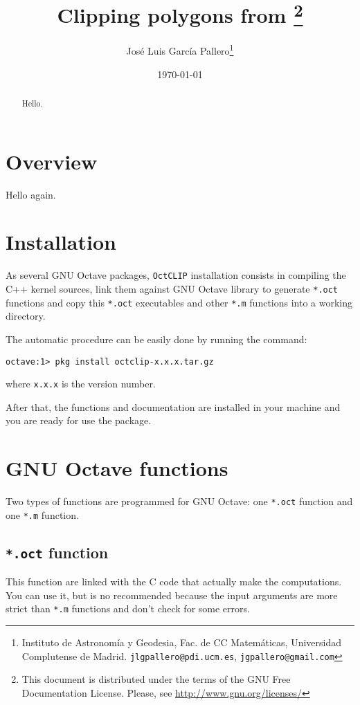 \documentclass[10pt,a4paper]{article}
\title{Clipping polygons from \octave\footnote{This document is distributed
       under the terms of the GNU Free Documentation License. Please, see
       \url{http://www.gnu.org/licenses/}}}
\author{Jos\'e Luis Garc\'ia Pallero\footnote{Instituto de Astronom\'ia y
        Geodesia, Fac. de CC Matem\'aticas, Universidad Complutense de Madrid.
        \texttt{jlgpallero@pdi.ucm.es}, \texttt{jgpallero@gmail.com}}}
\date{\today}
\newcommand{\octclip}{\texttt{OctCLIP}}
\newcommand{\octave}{GNU Octave}
\begin{document}
\maketitle

\nocite{eat-om}
\nocite{greiner1998}
\nocite{kim2006a}

\begin{abstract}
Hello.
\end{abstract}

\section{Overview}

Hello again.

\section{Installation}

As several \octave{} packages, \octclip{} installation consists in compiling the
C++ kernel sources, link them against \octave{} library to generate
\texttt{*.oct} functions and copy this \texttt{*.oct} executables and other
\texttt{*.m} functions into a working directory.

The automatic procedure can be easily done by running the command:

\begin{verbatim}
octave:1> pkg install octclip-x.x.x.tar.gz
\end{verbatim}
where \texttt{x.x.x} is the version number.

After that, the functions and documentation are installed in your machine and
you are ready for use the package.

\section{\octave{} functions}

Two types of functions are programmed for \octave: one \texttt{*.oct} function
and one \texttt{*.m} function.

\subsection{\texttt{*.oct} function}
\label{op-of}

This function are linked with the C code that actually make the computations.
You can use it, but is no recommended because the input arguments are more
strict than \texttt{*.m} functions and don't check for some errors.
\end{document}

